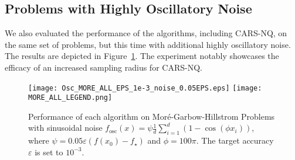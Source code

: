 \subsection{Problems with Highly Oscillatory Noise}
We also evaluated the performance of the algorithms, including CARS-NQ, on the same set of problems, but this time with additional highly oscillatory noise. The results are depicted in Figure~\ref{fig:Convex Quartic with Noise}.
The experiment notably showcases the efficacy of an increased sampling radius for CARS-NQ.
\begin{figure}
    \centering
    \texttt{[image: Osc\_MORE\_ALL\_EPS\_1e-3\_noise\_0.05EPS.eps]}
    \vspace{1mm}
    {
        {\texttt{[image: MORE\_ALL\_LEGEND.png]}}
    }
    \caption{Performance of each algorithm on Mor\'{e}-Garbow-Hillstrom Problems with sinusoidal noise $f_{\mathrm{osc}}(x) = \psi \frac{1}{d}\sum_{i=1}^{d}(1-\cos(\phi x_i))$, where  $\psi = 0.05\varepsilon(f(x_0)-f_\star)$ and $\phi = 100\pi$. The target accuracy $\varepsilon$ is set to $10^{-3}$.}
    \label{fig:Convex Quartic with Noise}
\end{figure}



